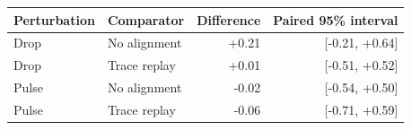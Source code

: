 \begin{tabular}{llrr}
\toprule
Perturbation & Comparator & Difference & Paired 95\% interval \\
\midrule
Drop & No alignment & +0.21 & [-0.21, +0.64] \\
Drop & Trace replay & +0.01 & [-0.51, +0.52] \\
Pulse & No alignment & -0.02 & [-0.54, +0.50] \\
Pulse & Trace replay & -0.06 & [-0.71, +0.59] \\
\bottomrule
\end{tabular}
